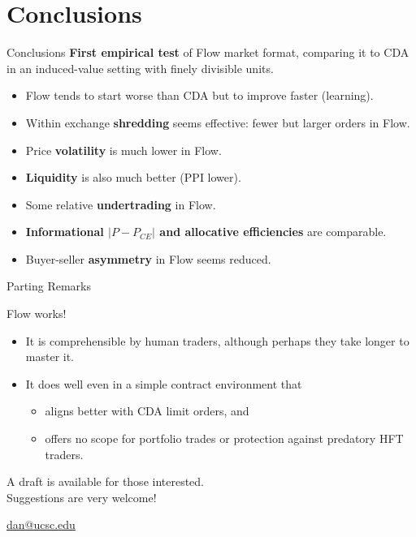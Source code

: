 \documentclass[10pt]{beamer}
\begin{document}
\section{Conclusions}

\begin{frame}{Conclusions}
\textbf{First empirical test} of Flow market format, comparing it to CDA in an induced-value setting with finely divisible units. %
\begin{itemize}
\item Flow tends to start worse than CDA but to improve faster (learning).
\item Within exchange \textbf{shredding} seems effective: fewer but larger orders in Flow. %
\item Price \textbf{volatility} is much lower in Flow. 
\item \textbf{Liquidity} is also much better (PPI lower). %
\item Some relative \textbf{undertrading} in Flow.
\item \textbf{Informational  $|P-P_{CE}|$ and allocative efficiencies} are comparable. %
\item Buyer-seller \textbf{asymmetry} in Flow seems reduced.%
\end{itemize} 
\end{frame}


\begin{frame}{Parting Remarks}

Flow works!
\begin{itemize}
    \item It is comprehensible by human traders, although perhaps they take longer to master it.
    \item It does well even in a simple contract environment that
\begin{itemize}
    \item aligns better with CDA limit orders, and
    \item offers no scope for portfolio trades or protection against predatory HFT traders.
\end{itemize}
\end{itemize}


\vspace{.4in}

\begin{center}
{\large A draft is available for those interested. \\ Suggestions are very welcome!}

\url{dan@ucsc.edu}
    
\end{center}


\end{frame}
\end{document}
